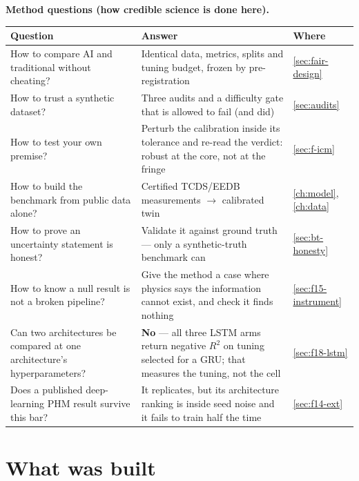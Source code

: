 \begin{center}\footnotesize
\setlength{\tabcolsep}{4pt}
\textbf{Method questions (how credible science is done here).}\\[2pt]
\begin{tabular}{@{}>{\raggedright\arraybackslash}p{}>{\raggedright\arraybackslash}p{}>{\raggedright\arraybackslash}p{}@{}}
  \toprule
  Question & Answer & Where \\
  \midrule
  How to compare AI and traditional without cheating? & Identical data, metrics, splits and
    tuning budget, frozen by pre-registration & \cref{sec:fair-design} \\
  How to trust a synthetic dataset? & Three audits and a difficulty gate that is allowed to
    fail (and did) & \cref{sec:audits} \\
  How to test your own premise? & Perturb the calibration inside its tolerance and re-read the
    verdict: robust at the core, not at the fringe & \cref{sec:f-icm} \\
  How to build the benchmark from public data alone? & Certified TCDS/EEDB measurements
    $\rightarrow$ calibrated twin & \cref{ch:model}, \cref{ch:data} \\
  How to prove an uncertainty statement is honest? & Validate it against ground truth ---
    only a synthetic-truth benchmark can & \cref{sec:bt-honesty} \\
  How to know a null result is not a broken pipeline? & Give the method a case where physics
    says the information cannot exist, and check it finds nothing & \cref{sec:f15-instrument} \\
  Can two architectures be compared at one architecture's hyperparameters? & \textbf{No} ---
    all three LSTM arms return negative $R^2$ on tuning selected for a GRU; that measures the
    tuning, not the cell & \cref{sec:f18-lstm} \\
  Does a published deep-learning PHM result survive this bar? & It replicates, but its
    architecture ranking is inside seed noise and it fails to train half the time &
    \cref{sec:f14-ext} \\
  \bottomrule
\end{tabular}
\end{center}

\section{What was built}

